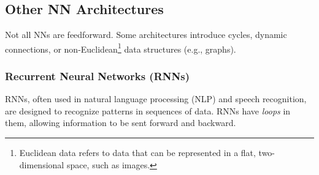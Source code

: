 \documentclass[oneside,11pt,dvipsnames]{book}
\numberwithin{equation}{section}
\theoremstyle{definition}
\theoremstyle{remark}
\begin{document}



\subsection{Other NN Architectures}

Not all NNs are feedforward.
Some architectures introduce cycles, dynamic connections, or non-Euclidean\footnote{Euclidean data refers to data that can be represented in a flat, two-dimensional space, such as images.} data structures (e.g., graphs).

\subsubsection{Recurrent Neural Networks (RNNs)} RNNs, often used in natural language processing (NLP) and speech recognition, are designed to recognize patterns in sequences of data. RNNs have \emph{loops} in them, allowing information to be sent forward and backward.
\end{document}
